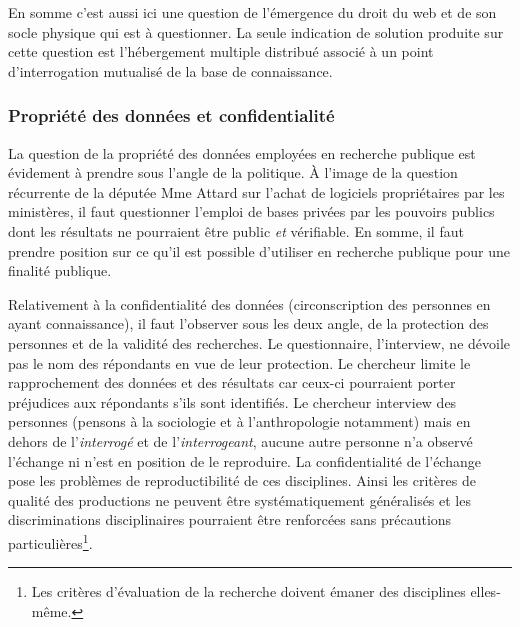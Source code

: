 
En somme c'est aussi ici une question de l'émergence du droit du web et de son socle physique qui est à questionner.
La seule indication de solution produite sur cette question est l'hébergement multiple distribué associé à un point d'interrogation mutualisé de la base de connaissance.
\subsubsection{Propriété des données et confidentialité}
La question de la propriété des données employées en recherche publique est évidement à prendre sous l'angle de la politique.
À l'image de la question récurrente de la députée Mme Attard sur l'achat de logiciels propriétaires par les ministères, il faut questionner l'emploi de bases privées par les pouvoirs publics dont les résultats ne pourraient être public \emph{et} vérifiable.
En somme, il faut prendre position sur ce qu'il est possible d'utiliser en recherche publique pour une finalité publique.

Relativement à la confidentialité des données (circonscription des personnes en ayant connaissance), il faut l'observer sous les deux angle, de la protection des personnes et de la validité des recherches.
Le questionnaire, l'interview, ne dévoile pas le nom des répondants en vue de leur protection.
Le chercheur limite le rapprochement des données et des résultats car ceux-ci pourraient porter préjudices aux répondants s'ils sont identifiés.
Le chercheur interview des personnes (pensons à la sociologie et à l'anthropologie notamment) mais en dehors de l'\textit{interrogé} et de l'\textit{interrogeant}, aucune autre personne n'a observé l'échange ni n'est en position de le reproduire.
La confidentialité de l'échange pose les problèmes de reproductibilité de ces disciplines.
Ainsi les critères de qualité des productions ne peuvent être systématiquement généralisés et les discriminations disciplinaires pourraient être renforcées sans précautions particulières\footnote{Les critères d'évaluation de la recherche doivent émaner des disciplines elles-même.}.

